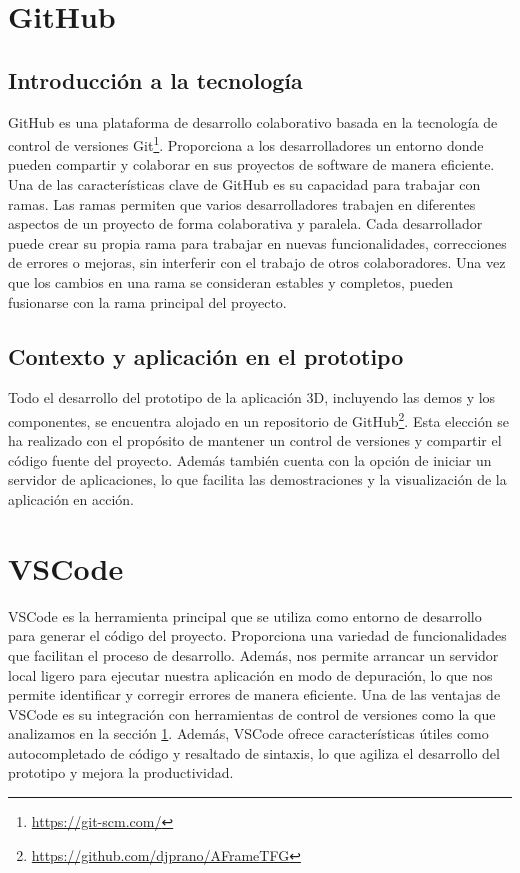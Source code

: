\documentclass[a4paper, 11pt]{book}
\begin{document}
\section{GitHub}
\label{sec:github}
\subsection{Introducción a la tecnología}
GitHub es una plataforma de desarrollo colaborativo basada en la tecnología de control de versiones Git\footnote{\url{https://git-scm.com/}}. Proporciona a los desarrolladores un entorno donde pueden compartir y colaborar en sus proyectos de software de manera eficiente.
Una de las características clave de GitHub es su capacidad para trabajar con ramas. Las ramas permiten que varios desarrolladores trabajen en diferentes aspectos de un proyecto de forma colaborativa y paralela. Cada desarrollador puede crear su propia rama para trabajar en nuevas funcionalidades, correcciones de errores o mejoras, sin interferir con el trabajo de otros colaboradores. Una vez que los cambios en una rama se consideran estables y completos, pueden fusionarse con la rama principal del proyecto.
\subsection{Contexto y aplicación en el prototipo}
Todo el desarrollo del prototipo de la aplicación 3D, incluyendo las demos y los componentes, se encuentra alojado en un repositorio de GitHub\footnote{\url{https://github.com/djprano/AFrameTFG}}. Esta elección se ha realizado con el propósito de mantener un control de versiones y compartir el código fuente del proyecto.
Además también cuenta con la opción de iniciar un servidor de aplicaciones, lo que facilita las demostraciones y la visualización de la aplicación en acción.

\section{VSCode}
VSCode es la herramienta principal que se utiliza como entorno de desarrollo para generar el código del proyecto. Proporciona una variedad de funcionalidades que facilitan el proceso de desarrollo. Además, nos permite arrancar un servidor local ligero para ejecutar nuestra aplicación en modo de depuración, lo que nos permite identificar y corregir errores de manera eficiente.
Una de las ventajas de VSCode es su integración con herramientas de control de versiones como la que analizamos en la sección \ref{sec:github}. Además, VSCode ofrece características útiles como autocompletado de código y resaltado de sintaxis, lo que agiliza el desarrollo del prototipo y mejora la productividad.
\end{document}
